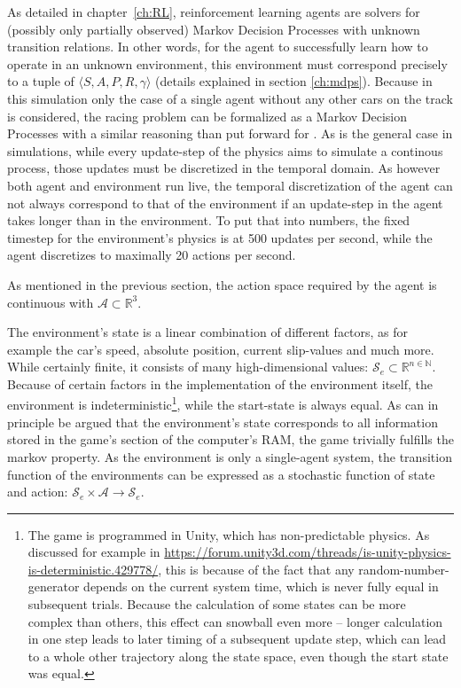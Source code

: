 As detailed in chapter~\ref{ch:RL}, reinforcement learning agents are solvers for (possibly only partially observed) Markov Decision Processes with unknown transition relations. In other words, for the agent to successfully learn how to operate in an unknown environment, this environment must correspond precisely to a tuple of $\langle S, A, P, R, \gamma \rangle$ (details explained in section \ref{ch:mdps}). Because in this simulation only the case of a single agent without any other cars on the track is considered, the racing problem can be formalized as a Markov Decision Processes with a similar reasoning than \citet[chapter 4]{wymann_torcs_2015} put forward for . As is the general case in simulations, while every update-step of the physics aims to simulate a continous process, those updates must be discretized in the temporal domain. As however both agent and environment run live, the temporal discretization of the agent can not always correspond to that of the environment if an update-step in the agent takes longer than in the environment. To put that into numbers, the fixed timestep for the environment's physics is at 500 updates per second, while the agent discretizes to maximally 20 actions per second.

As mentioned in the previous section, the action space required by the agent is continuous with $\mathcal{A} \subset \mathds{R}^3$. 

The environment's state is a linear combination of different factors, as for example the car's speed, absolute position, current slip-values and much more. While certainly finite, it consists of many high-dimensional values: $\mathcal{S}_e \subset \mathds{R}^{n \in \mathds{N}}$. Because of certain factors in the implementation of the environment itself, the environment is indeterministic\footnote{The game is programmed in Unity, which has non-predictable physics. As discussed for example in \url{https://forum.unity3d.com/threads/is-unity-physics-is-deterministic.429778/}, this is because of the fact that any random-number-generator depends on the current system time, which is never fully equal in subsequent trials. Because the calculation of some states can be more complex than others, this effect can snowball even more -- longer calculation in one step leads to later timing of a subsequent update step, which can lead to a whole other trajectory along the state space, even though the start state was equal.}, while the start-state is always equal. As can in principle be argued that the environment's state corresponds to all information stored in the game's section of the computer's RAM, the game trivially fulfills the markov property. As the environment is only a single-agent system, the transition function of the environments can be expressed as a stochastic function of state and action: $\mathcal{S}_e \times \mathcal{A} \rightarrow \mathcal{S}_e$.

